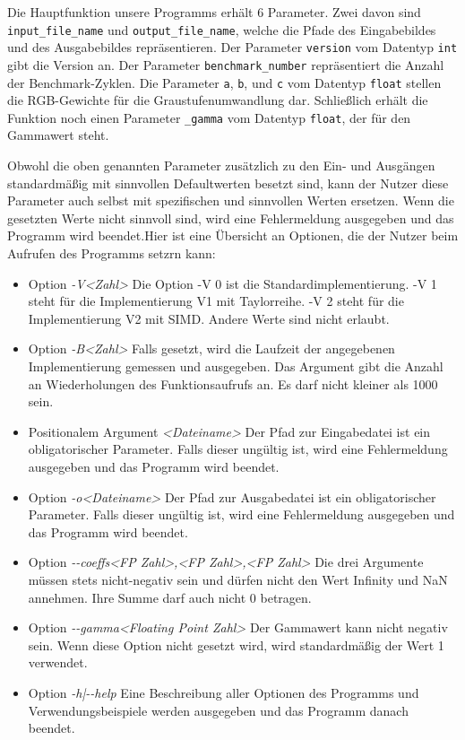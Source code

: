 \documentclass[course=erap]{aspdoc}
\begin{document}
\par
Die Hauptfunktion unsere Programms erhält 6 Parameter. Zwei davon sind \texttt{input\_file\_name} und \texttt{output\_file\_name}, welche die Pfade des Eingabebildes und des Ausgabebildes repräsentieren. Der Parameter \texttt{version} vom Datentyp \texttt{int} gibt die Version an. Der Parameter \texttt{benchmark\_number} repräsentiert die Anzahl der Benchmark-Zyklen. Die Parameter \texttt{a}, \texttt{b}, und \texttt{c} vom Datentyp \texttt{float} stellen die RGB-Gewichte für die Graustufenumwandlung dar. Schließlich erhält die Funktion noch einen Parameter \texttt{\_gamma} vom Datentyp \texttt{float}, der für den Gammawert steht.

\par
Obwohl die oben genannten Parameter zusätzlich zu den Ein- und Ausgängen standardmäßig mit sinnvollen Defaultwerten besetzt sind, kann der Nutzer diese Parameter auch selbst mit spezifischen und sinnvollen Werten ersetzen. Wenn die gesetzten Werte nicht sinnvoll sind, wird eine Fehlermeldung ausgegeben und das Programm wird beendet.Hier ist eine Übersicht an Optionen, die der Nutzer beim Aufrufen des Programms setzrn kann:

\begin{itemize}
\item Option \emph{-V<Zahl>} Die Option -V 0 ist die Standardimplementierung. -V 1 steht für die Implementierung V1 mit Taylorreihe. -V 2 steht für die Implementierung V2 mit SIMD. Andere Werte sind nicht erlaubt.
\item Option \emph{-B<Zahl>} Falls gesetzt, wird die Laufzeit der angegebenen Implementierung gemessen und ausgegeben. Das Argument gibt die Anzahl an Wiederholungen des Funktionsaufrufs an. Es darf nicht kleiner als 1000 sein.
\item Positionalem Argument \emph{<Dateiname>} Der Pfad zur Eingabedatei ist ein obligatorischer Parameter. Falls dieser ungültig ist, wird eine Fehlermeldung ausgegeben und das Programm wird beendet.
\item Option \emph{-o<Dateiname>} Der Pfad zur Ausgabedatei ist ein obligatorischer Parameter. Falls dieser ungültig ist, wird eine Fehlermeldung ausgegeben und das Programm wird beendet.
\item Option \emph{-{}-coeffs<FP Zahl>,<FP Zahl>,<FP Zahl>} Die drei Argumente müssen stets nicht-negativ sein und dürfen nicht den Wert Infinity und NaN annehmen. Ihre Summe darf auch nicht 0 betragen.
\item Option \emph{-{}-gamma<Floating Point Zahl>} Der Gammawert kann nicht negativ sein. Wenn diese Option nicht gesetzt wird, wird standardmäßig der Wert 1 verwendet.
\item Option \emph{-h|-{}-help} Eine Beschreibung aller Optionen des Programms und Verwendungsbeispiele werden ausgegeben und das Programm danach beendet. 
\end{itemize}
\end{document}
